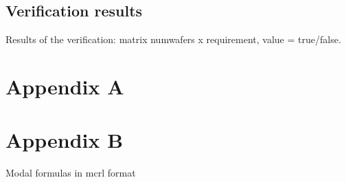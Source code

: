 \documentclass[12pt]{report}
\begin{document}
	\section{Verification results}
	Results of the verification: matrix numwafers x requirement, value = true/false.	
	
	\chapter{Appendix A}

	
	\chapter{Appendix B}
	Modal formulas in mcrl format
\end{document}
